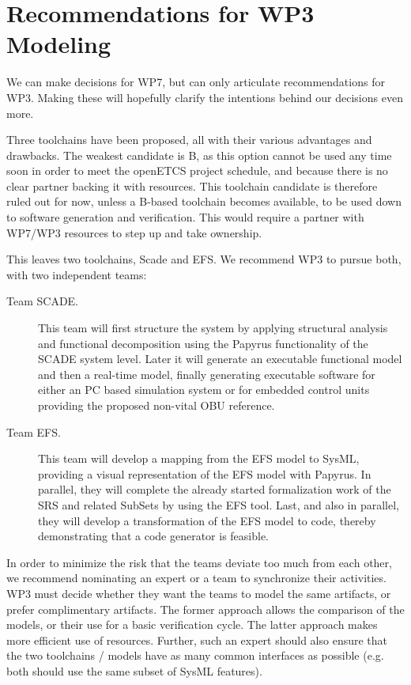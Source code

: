 \section{Recommendations for WP3 Modeling}

We can make decisions for WP7, but can only articulate recommendations for WP3.  Making these will hopefully clarify the intentions behind our decisions even more.

Three toolchains have been proposed, all with their various advantages and drawbacks. The weakest candidate is B, as this option cannot be used any time soon in order to meet the openETCS project schedule, and because there is no clear partner backing it with resources.  This toolchain candidate is therefore ruled out for now, unless a B-based  toolchain becomes available, to be used down to software generation and verification.  This would require a partner with WP7/WP3 resources to step up and take ownership.

This leaves two toolchains, Scade and EFS.  We recommend WP3 to pursue both, with two independent teams:

\begin{description}

\item[Team SCADE.] This team will first structure the system by applying structural analysis and functional decomposition using the Papyrus functionality of the SCADE system level.  Later it will generate an executable functional model and then a real-time model, finally generating executable software for either an PC based simulation system or for embedded control units providing the proposed non-vital OBU reference.

\item[Team EFS.] This team will develop a mapping from the EFS model to SysML, providing a visual representation of the EFS model with Papyrus. In parallel, they will complete the already started formalization work of the SRS and related SubSets by using the EFS tool.  Last, and also in parallel, they will develop a transformation of the EFS model to code, thereby demonstrating that a code generator is feasible.

\end{description}

In order to minimize the risk that the teams deviate too much from each other, we recommend nominating an expert or a team to synchronize their activities.  WP3 must decide whether they want the teams to model the same artifacts, or prefer complimentary artifacts.  The former approach allows the comparison of the models, or their use for a basic verification cycle.  The latter approach makes more efficient use of resources. Further, such an expert should also ensure that the two toolchains / models have as many common interfaces as possible (e.g. both should use the same subset of SysML features).

